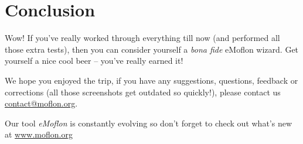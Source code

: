 \chapter{Conclusion} 

Wow!  If you've really worked through everything till now (and performed all those extra tests), then you can consider yourself a \emph{bona fide} eMoflon wizard.
Get yourself a nice cool beer -- you've really earned it!

We hope you enjoyed the trip, if you have any suggestions, questions, feedback or corrections (all those screenshots get outdated so quickly!), please contact us \url{contact@moflon.org}.

Our tool \emph{eMoflon} is constantly evolving so don't forget to check out what's new at \url{www.moflon.org}
 